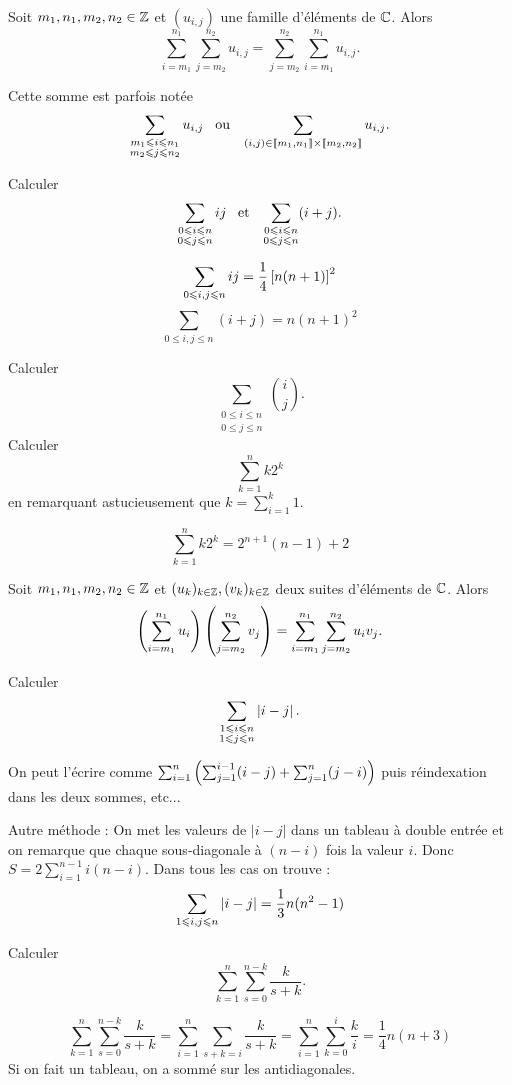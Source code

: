 \documentclass{magnolia}
\begin{document}
\begin{proposition}
Soit $m_1,n_1,m_2,n_2\in\mathbb{Z}$ et $(u_{i,j})$ une famille d'éléments de $\mathbb{C}$. Alors
\[\sum_{i=m_1}^{n_1} \sum_{j=m_2}^{n_2} u_{i, j} =
\sum_{j=m_2}^{n_2} \sum_{i=m_1}^{n_1} u_{i, j}.\]
\end{proposition}

\begin{remarqueUnique}
\remarque Cette somme est parfois notée
\[\sum_{\substack{m_1 \leqslant i \leqslant n_1 \\ m_2 \leqslant j \leqslant n_2}} u_{i, j} \quad\!\text{ou}\quad\! 
  \sum_{(i,j) \in \left\llbracket m_1,n_1\right\rrbracket \times \left\llbracket m_2,n_2\right\rrbracket} u_{i, j}.\]
\end{remarqueUnique}

\begin{exos}
\exo Calculer
  \[\sum_{\substack{0 \leqslant i \leqslant n\\0 \leqslant j \leqslant n}} ij \quad\!\text{et}\quad\!
    \sum_{\substack{0 \leqslant i \leqslant n\\0 \leqslant j \leqslant n}} (i+j).\]
  \begin{sol}
\[\sum_{0 \leqslant i,j \leqslant n} ij=\frac{1}{4}\left[n(n+1)\right]^2\]
\[\sum_{0 \leq i,j \leq n} (i+j)=n(n+1)^2\]
  \end{sol}
\exo Calculer
  \[\sum_{\substack{0 \leq i \leq n\\0 \leq j \leq n}} \binom{i}{j}.\]
\exo Calculer
  \[\sum_{k=1}^n k 2^k\]
  en remarquant astucieusement que $k=\sum_{i=1}^k 1$.
  \begin{sol}
  \[\sum_{k=1}^n k 2^k=2^{n+1}(n-1)+2\]
  \end{sol}
\end{exos}

\begin{proposition}
Soit $m_1,n_1,m_2,n_2\in\mathbb{Z}$ et $(u_k)_{k\in\mathbb{Z}}, (v_k)_{k\in\mathbb{Z}}$ deux suites d'éléments de $\mathbb{C}$. Alors
\[\left(\sum_{i=m_1}^{n_1} u_i\right)\left(\sum_{j=m_2}^{n_2} v_j\right)=\sum_{i=m_1}^{n_1} \sum_{j=m_2}^{n_2} u_i v_j.\]
\end{proposition}


\begin{exos}
\exo Calculer
  \[\sum_{\substack{1 \leqslant i \leqslant n\\1 \leqslant j \leqslant n}}\left|i-j\right|.\]
  \begin{sol}
  On peut l'écrire comme $\sum_{i=1}^n\left(\sum_{j=1}^{i-1}(i-j)+\sum_{j=1}^n(j-i)\right)$ puis réindexation dans les deux sommes, etc...
  
  Autre méthode : On met les valeurs de $|i-j|$ dans un tableau à double entrée et on remarque que chaque sous-diagonale à $(n-i)$ fois la valeur $i$. Donc $S=2\sum_{i=1}^{n-1}i(n-i)$. Dans tous les cas on trouve :
\[\sum_{1\leqslant i, j \leqslant n}\left|i-j\right|=\frac{1}{3}n(n^2-1)\]
  \end{sol}
\exo Calculer
  \[\sum_{k = 1}^n \sum_{s = 0}^{n-k} \dfrac{k}{s + k}.\]
  \begin{sol}
  
  
\[\sum_{k=1}^n \sum_{s=0}^{n-k} \frac{k}{s+k}=\sum_{i=1}^n\sum_{s+k=i}\frac{k}{s+k}=\sum_{i=1}^n\sum_{k=0}^{i}\frac{k}{i}=\frac{1}{4}n(n+3)\]
Si on fait un tableau, on a sommé sur les antidiagonales.
  \end{sol}
\end{exos}
\end{document}
